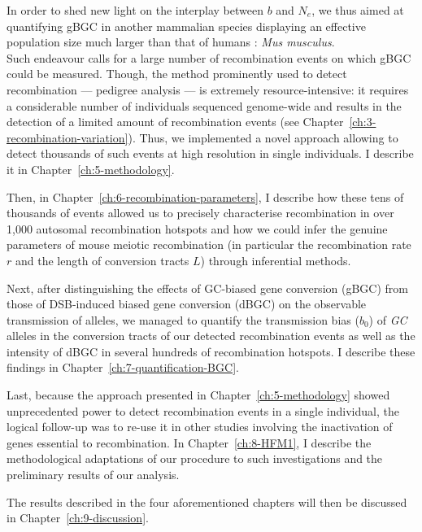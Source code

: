 In order to shed new light on the interplay between $b$ and $N_e$, we thus aimed at quantifying gBGC in another mammalian species displaying an effective population size much larger than that of humans \citep{geraldes2008inferring,phifer-rixey2012adaptive,davies2015factors}: \textit{Mus musculus}.\\

Such endeavour calls for a large number of recombination events on which gBGC could be measured. 
Though, the method prominently used to detect recombination — pedigree analysis — is extremely resource-intensive: it requires a considerable number of individuals sequenced genome-wide and results in the detection of a limited amount of recombination events (see Chapter~\ref{ch:3-recombination-variation}).
Thus, we implemented a novel approach allowing to detect thousands of such events at high resolution in single individuals. I describe it in Chapter~\ref{ch:5-methodology}.

Then, in Chapter~\ref{ch:6-recombination-parameters}, I describe how these tens of thousands of events allowed us to precisely characterise recombination in over 1,000 autosomal recombination hotspots and how we could infer the genuine parameters of mouse meiotic recombination (in particular the recombination rate $r$ and the length of conversion tracts $L$) through inferential methods.

Next, after distinguishing the effects of GC-biased gene conversion (gBGC) from those of DSB-induced biased gene conversion (dBGC) on the observable transmission of alleles, we managed to quantify the transmission bias ($b_0$) of \textit{GC} alleles in the conversion tracts of our detected recombination events as well as the intensity of dBGC in several hundreds of recombination hotspots. 
I describe these findings in Chapter~\ref{ch:7-quantification-BGC}.

Last, because the approach presented in Chapter~\ref{ch:5-methodology} showed unprecedented power to detect recombination events in a single individual, the logical follow-up was to re-use it in other studies involving the inactivation of genes essential to recombination.
In Chapter~\ref{ch:8-HFM1}, I describe the methodological adaptations of our procedure to such investigations and the preliminary results of our analysis.

The results described in the four aforementioned chapters will then be discussed in Chapter~\ref{ch:9-discussion}.




